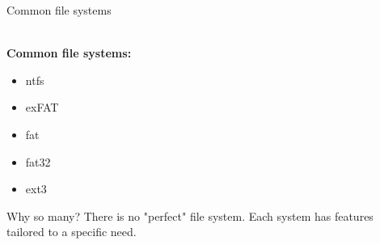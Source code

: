 \begin{frame}[t]{Common file systems}

  \hspace*{.6in}
  \begin{minipage}{3.5in}
	\vspace*{.3in}
	\\\textbf{Common file systems:}
	\begin{itemize}
	\renewcommand{\labelitemi}{$\bullet$}
		\item ntfs
		\item exFAT
		\item fat
		\item fat32
		\item ext3
	\end{itemize}
	\vspace*{.2in}
	Why so many? There is no "perfect" file system. Each system has features tailored to a specific need.
  
  \end{minipage}

\end{frame}